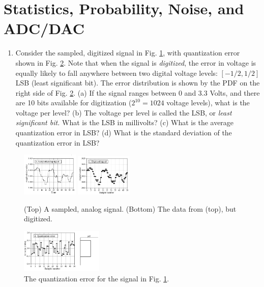\documentclass{article}
\begin{document}
\section{Statistics, Probability, Noise, and ADC/DAC}

\begin{enumerate}
\item Consider the sampled, digitized signal in Fig. \ref{fig:1}, with quantization error shown in Fig. \ref{fig:2}.  Note that when the signal is \textit{digitized}, the error in voltage is equally likely to fall anywhere between two digital voltage levels: $[-1/2,1/2]$ LSB (least significant bit).  The error distribution is shown by the PDF on the right side of Fig. \ref{fig:2}.  (a) If the signal ranges between 0 and 3.3 Volts, and there are 10 bits available for digitization ($2^10 = 1024$ voltage levels), what is the voltage per level? (b) The voltage per level is called the LSB, or \textit{least significant bit.} What is the LSB in millivolts? (c) What is the average quantization error in LSB?  (d) What is the standard deviation of the quantization error in LSB?
\end{enumerate}

\begin{figure}
\centering
\includegraphics[width=0.24\textwidth]{quant_1.png}
\includegraphics[width=0.24\textwidth]{quant_2.png}
\caption{\label{fig:1} (Top) A sampled, analog signal. (Bottom) The data from (top), but digitized.}
\end{figure}
\begin{figure}
\centering
\includegraphics[width=0.35\textwidth]{quant_3.png}
\caption{\label{fig:2} The quantization error for the signal in Fig. \ref{fig:1}.}
\end{figure}
\end{document}
